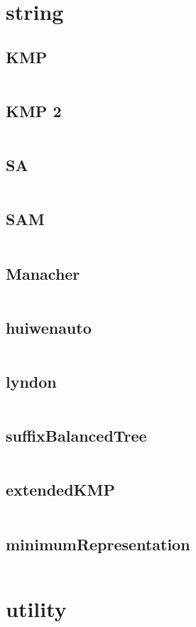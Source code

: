 \section{string}
  \subsection{KMP}
    \inputminted{cpp}{../code/string/KMP.cpp}
  \subsection{KMP 2}
    \inputminted{cpp}{../code/string/KMP_2.cpp}
  \subsection{SA}
    \inputminted{cpp}{../code/string/SA.cpp}
  \subsection{SAM}
    \inputminted{cpp}{../code/string/SAM.cpp}
  \subsection{Manacher}
    \inputminted{cpp}{../code/string/Manacher.cpp}
  \subsection{huiwenauto}
    \inputminted{cpp}{../code/string/huiwenauto.cpp}
  \subsection{lyndon}
    \inputminted{cpp}{../code/string/lyndon.cpp}
  \subsection{suffixBalancedTree}
    \inputminted{cpp}{../code/string/suffixBalancedTree.cpp}
  \subsection{extendedKMP}
    \inputminted{cpp}{../code/string/extendedKMP.cpp}
  \subsection{minimumRepresentation}
    \inputminted{cpp}{../code/string/minimumRepresentation.cpp}
\section{utility}
